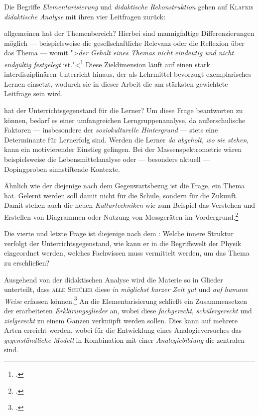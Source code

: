 Die Begriffe \textit{Elementarisierung} und \textit{didaktische Rekonstruktion} gehen auf \textsc{Klafki}s \textit{didaktische Analyse} mit ihren vier Leitfragen zurück:
\begin{items}
\item {} allgemeinen  hat der Themenbereich? Hierbei sind mannigfaltige Differenzierungen möglich --- beispielsweise die gesellschaftliche Relevanz oder die Reflexion über das Thema --- womit ">\textit{der Gehalt eines Themas nicht eindeutig und nicht endgültig festgelegt} ist."<\footcite[S.\,78]{Kircher2013} Diese Zieldimension läuft auf einen stark interdisziplinären Unterricht hinaus, der als Lehrmittel bevorzugt exemplarisches Lernen einsetzt, wodurch sie in dieser Arbeit die am stärksten gewichtete Leitfrage sein wird.
\item {} hat der Unterrichtsgegenstand für die Lerner? Um diese Frage beantworten zu können, bedarf es einer umfangreichen Lerngruppenanalyse, da außerschulische Faktoren --- insbesondere der \textit{soziokulturelle Hintergrund} --- stets eine Determinante für Lernerfolg sind. Werden die Lerner \textit{da abgeholt, wo sie stehen}, kann ein motivierender Einstieg gelingen. Bei der Massenspektrometrie wären beispielsweise die Lebensmittelanalyse oder --- besonders aktuell --- Dopingproben sinnstiftende Kontexte. 
\item Ähnlich wie der diejenige nach dem Gegenwartsbezug ist die Frage,  ein Thema hat. Gelernt werden soll damit nicht für die Schule, sondern für die Zukunft. Damit stehen auch die neuen \textit{Kulturtechniken} wie zum Beispiel das Verstehen und Erstellen von Diagrammen oder Nutzung von Messgeräten im Vordergrund.\footcite[vgl.][S.\,79]{Kircher2013} 
\item Die vierte und letzte Frage ist diejenige nach dem : Welche innere Struktur verfolgt der Unterrichtsgegenstand, wie kann er in die Begriffswelt der Physik eingeordnet werden, welches Fachwissen muss vermittelt werden, um das Thema zu erschließen?
\end{items}
Ausgehend von der didaktischen Analyse wird die Materie so in Glieder unterteilt, dass \textsc{alle Schüler} diese \textit{in möglichst kurzer Zeit gut} und \textit{auf humane Weise} erfassen können.\footcite[vgl.][S.\,108--137]{Kircher2013} An die Elementarisierung schließt ein Zusammensetzen der erarbeiteten \textit{Erklärungsglieder} an, wobei diese \textit{fachgerecht}, \textit{schülergerecht} und \textit{zielgerecht} zu einem Ganzen verknüpft werden sollen. Dies kann auf mehrere Arten erreicht werden, wobei für die Entwicklung eines Analogieversuches das \textit{gegenständliche Modell} in Kombination mit einer \textit{Analogiebildung} die zentralen sind.  

